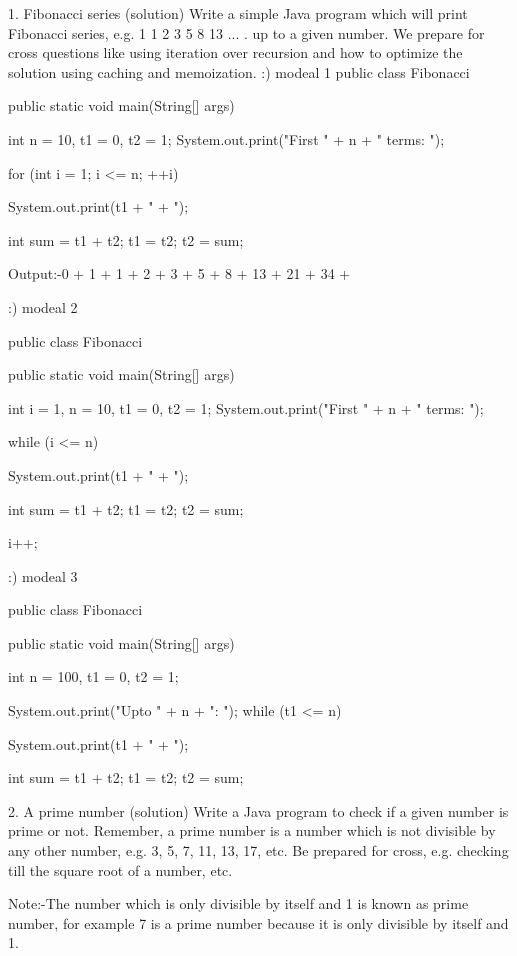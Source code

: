 1. Fibonacci series (solution)
Write a simple Java program which will print Fibonacci series, e.g. 1 1 2 3 5 8 13 ... . up to a given number. 
We prepare for cross questions like using iteration over recursion and how to optimize the solution using caching 
and memoization.
 :)
 modeal 1
 public class Fibonacci {

    public static void main(String[] args) {

        int n = 10, t1 = 0, t2 = 1;
        System.out.print("First " + n + " terms: ");

        for (int i = 1; i <= n; ++i)
        {
            System.out.print(t1 + " + ");

            int sum = t1 + t2;
            t1 = t2;
            t2 = sum;
        }
    }
}
 
 Output:-0 + 1 + 1 + 2 + 3 + 5 + 8 + 13 + 21 + 34 +
 
 :)  modeal 2
 
	public class Fibonacci {

    public static void main(String[] args) {

        int i = 1, n = 10, t1 = 0, t2 = 1;
        System.out.print("First " + n + " terms: ");

        while (i <= n)
        {
            System.out.print(t1 + " + ");

            int sum = t1 + t2;
            t1 = t2;
            t2 = sum;

            i++;
        }
    }
}


	:)	modeal 3
	
	public class Fibonacci {

    public static void main(String[] args) {

        int n = 100, t1 = 0, t2 = 1;
        
        System.out.print("Upto " + n + ": ");
        while (t1 <= n)
        {
            System.out.print(t1 + " + ");

            int sum = t1 + t2;
            t1 = t2;
            t2 = sum;
        }
    }
}
 


2. A prime number (solution)
Write a Java program to check if a given number is prime or not. Remember,
 a prime number is a number which is not divisible by any other number, e.g. 3, 5, 7, 11, 13, 17, etc. 
 Be prepared for cross, e.g. checking till the square root of a number, etc.
 
 Note:-The number which is only divisible by itself and 1 is known as prime number, 
		for example 7 is a prime number because it is only divisible by itself and 1.
 
